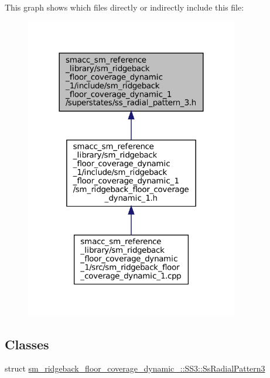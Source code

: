 This graph shows which files directly or indirectly include this file\+:
\nopagebreak
\begin{figure}[H]
\begin{center}
\leavevmode
\includegraphics[width=264pt]{sm__ridgeback__floor__coverage__dynamic__1_2include_2sm__ridgeback__floor__coverage__dynamic__1_4392322fe0c252128548e5b2c4287324}
\end{center}
\end{figure}
\subsection*{Classes}
\begin{DoxyCompactItemize}
\item 
struct \hyperlink{structsm__ridgeback__floor__coverage__dynamic__1_1_1SS3_1_1SsRadialPattern3}{sm\+\_\+ridgeback\+\_\+floor\+\_\+coverage\+\_\+dynamic\+\_\+::\+S\+S3\+::\+Ss\+Radial\+Pattern3}
\end{DoxyCompactItemize}
